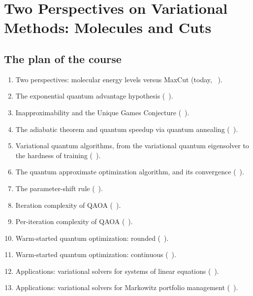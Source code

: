 \documentclass[handoutsbeamer.tex]{subfiles}
\begin{document}
\thispagestyle{empty}

\ona{ \setcounter{chapter}{0} } %
\chapter{Two Perspectives on Variational Methods: Molecules and Cuts}\label{C.Motivation}

\section{The plan of the course}

\begin{frame}
\onp{\footnotesize}
\begin{enumerate}\setlength\itemsep{0.05em}
    \item Two perspectives: molecular energy levels versus MaxCut (today, \Chap~).
    \item The exponential quantum advantage hypothesis (\Chap~).
    \item Inapproximability and the Unique Games Conjecture (\Chap~).
    \item The adiabatic theorem and quantum speedup via quantum annealing (\Chap~).
    \item Variational quantum algorithms, from the variational quantum eigensolver to the hardness of training (\Chap~).
    \item The quantum approximate optimization algorithm, and its convergence (\Chap~).
    \item The parameter-shift rule (\Chap~).
    \item Iteration complexity of QAOA (\Chap~).
    \item Per-iteration complexity of QAOA (\Chap~).
    \item Warm-started quantum optimization: rounded (\Chap~).
    \item Warm-started quantum optimization: continuous (\Chap~).
    \item Applications: variational solvers for systems of linear equations (\Chap~).
    \item Applications: variational solvers for Markowitz portfolio management (\Chap~).
\end{enumerate}
\end{frame}
\end{document}
